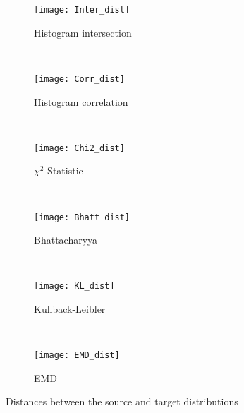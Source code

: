 \begin{figure}[!ht]
    \centering
    \begin{subfigure}[b]{0.3\textwidth}
		\centering
		\texttt{[image: Inter\_dist]}	
		\caption{Histogram intersection}
        \label{fig:inter_dist}
	\end{subfigure}
	~ %
    \begin{subfigure}[b]{0.3\textwidth}
		\centering
		\texttt{[image: Corr\_dist]}	
		\caption{Histogram correlation}
        \label{fig:corr_dist}
	\end{subfigure}
    ~ %
    \begin{subfigure}[b]{0.3\textwidth}
		\centering
		\texttt{[image: Chi2\_dist]}	
		\caption{$\chi^2$ Statistic}
        \label{fig:chi_square}
	\end{subfigure}  \\[2ex]
	
	
	\begin{subfigure}[b]{0.3\textwidth}
		\centering
		\texttt{[image: Bhatt\_dist]}	
		\caption{Bhattacharyya}
        \label{fig:bhatt_dist}
	\end{subfigure}
	~ %
    \begin{subfigure}[b]{0.3\textwidth}
		\centering
		\texttt{[image: KL\_dist]}	
		\caption{Kullback-Leibler}
        \label{fig:kl_div}
	\end{subfigure}
    ~ %
    \begin{subfigure}[b]{0.3\textwidth}
		\centering
		\texttt{[image: EMD\_dist]}	
		\caption{EMD}
        \label{fig:emd}
	\end{subfigure}
   
   \caption{Distances between the source and target distributions}
   \label{fig:distances}
\end{figure}

